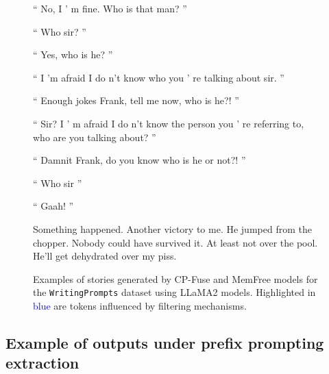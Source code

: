 \begin{figure}[!htbp]
\begin{mdframed}
\begin{minipage}[t]{\textwidth}
 “ No, I ’ m fine. Who is that man? ” 
 
 “ Who sir? ” 
 
 “ Yes, who is he? ” 
 
 “ I ’m afraid I do n't know who you ’ re talking about sir. ” 
 
 “ Enough jokes Frank, tell me now, who is he?! ” 
 
 “ Sir? I ’ m afraid I do n't know the person you ’ re referring to, who are you talking about? ” 
 
 “ Damnit Frank, do you know who is he or not?! ” 
 
 “ Who sir ” 
 
 “ Gaah! ” 
 
 Something happened. Another victory to me. He jumped from the chopper. Nobody could have survived it. At least not over the pool. He'll get dehydrated over my piss. \end{minipage}
    \end{mdframed}
    \caption{Examples of stories generated by CP-Fuse and MemFree models for the \texttt{WritingPrompts} dataset using LLaMA2 models. Highlighted in \textcolor{blue}{blue} are tokens influenced by filtering mechanisms.}
    \label{fig:example2_story_memfree}
\end{figure}



\newpage

\subsection{Example of outputs under prefix prompting extraction}
\label{app:attacks}

